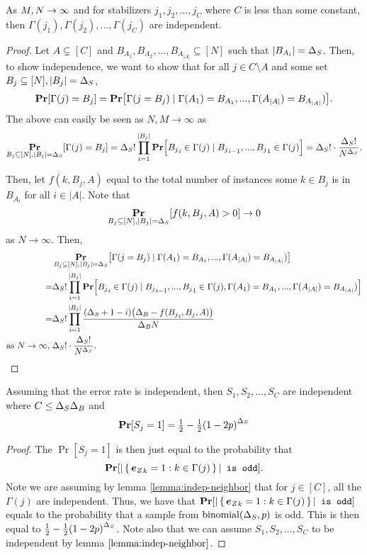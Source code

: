 \begin{lemma}{As $M, N \rightarrow \infty$ and for stabilizers $j_1, j_2, ..., j_C$ where $C$ is less than some constant,
		then $\Gamma(j_1), \Gamma(j_2), ..., \Gamma(j_C)$ are independent.
	}
	\label{lemma:indep-neighbor}
	\begin{proof}
		Let $A \subsetneq [C]$ and $B_{A_1}, B_{A_2}, ..., B_{A_{|A|}} \subseteq [N]$ such that $|B_{A_i}| = {\Delta_{S}}$.	
		Then, to show independence, we want to show that for all $j \in C \setminus A$
		and some set $B_j \subseteq [N], |B_j| = {\Delta_{S}}$,
		$$
			\Pr\mleft[\Gamma(j) = B_j\mright] = \Pr\mleft[\Gamma(j = B_j) \mid \Gamma(A_1) = B_{A_1}, ..., \Gamma(A_{|A|}) = B_{A_{|A|}})\mright].
		$$
		The above can easily be seen as $N, M \rightarrow \infty$ as
		$$
			\Pr_{B_j \subseteq [N], |B_j| = \DegStab}[\Gamma(j) = B_j] = \DegStab! \prod_{i =1}^{|B_j|} \Pr\mleft[{B_j}_i \in \Gamma(j) \mid {B_j}_{i-1}, ..., {B_j}_{1} \in \Gamma(j)\mright] = \DegStab! \cdot \frac{\DegStab!}{N^\DegStab}.
		$$

		Then, let $f(k, B_j, A)$ equal to the total number of instances some $k \in B_j$ is 
		in $B_{A_i}$ for all $i \in |A|$. Note that
		$$
			\operatorname*{\mathbf{Pr}}_{B_j \subseteq [N], |B_j| = {\Delta_{S}}}[f(k, B_j, A) > 0] \rightarrow 0
		$$ as $N \rightarrow \infty$.
		Then, 
		\begin{align*}
			&\Pr_{B_j \subseteq [N], |B_j| = \DegStab}\mleft[\Gamma(j = B_j) \mid \Gamma(A_1) = B_{A_1}, ..., \Gamma(A_{|A|}) = B_{A_{|A|}})\mright] \\
				= &\DegStab! \prod_{i =1}^{|B_j|} \Pr\mleft[{B_j}_i \in \Gamma(j) \mid {B_j}_{i-1}, ..., {B_j}_{1} \in \Gamma(j), \Gamma(A_1) = B_{A_1}, ..., \Gamma(A_{|A|}) = B_{A_{|A|}})\mright]\\
				= &\DegStab! \prod_{i =1}^{|B_j|} \frac{(\DegStab + 1 - i) \mleft(\DegBit - f({B_j}_i, B_j, A)\mright)}{\DegBit N} \\
				\text{as } N \rightarrow \infty,\; &\DegStab! \cdot \frac{\DegStab!}{N^\DegStab}.
		\end{align*}
	\end{proof}
\end{lemma}

\begin{lemma}{
	Assuming that the error rate is independent, then
	$S_1, S_2, ..., S_C$ are independent where $C \leq {\Delta_{S}} {\Delta_{B}}$ and
	$$
		\Pr[S_j = 1] = \PrS
	$$
}
\label{lemma:Sj}
\begin{proof}
	The $\Pr[S_j = 1]$ is then just equal to the probability that 
	$$
		\Pr\mleft[|\set{\vecError_k = 1 : k \in \Gamma(j)}| \texttt{ is odd}\mright].
	$$
	Note we are assuming by lemma \ref{lemma:indep-neighbor} that for $j \in [C]$, all the $\Gamma(j)$
	are independent. Thus, we have that 
	$
		\Pr\mleft[|\set{\vecError_k = 1 : k \in \Gamma(j)}| \texttt{ is odd}\mright]
	$ equals to the probability that a sample from $\operatorname{binomial}({\Delta_{S}}, p)$ is odd.
	This is then equal to $\PrS$. Note also that we can assume $S_1, S_2, ..., S_C$
	to be independent by lemma $\ref{lemma:indep-neighbor}$.
	
\end{proof}
\end{lemma}

